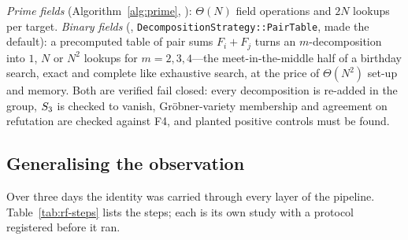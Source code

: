 \emph{Prime fields} (Algorithm~\ref{alg:prime},
): $\Theta(N)$ field operations and
$2N$ lookups per target. \emph{Binary fields}
(,
\texttt{DecompositionStrategy::PairTable}, made the default): a precomputed
table of pair sums $F_i+F_j$ turns an $m$-decomposition into $1$, $N$ or
$N^2$ lookups for $m=2,3,4$---the meet-in-the-middle half of a birthday
search, exact and complete like exhaustive search, at the price of
$\Theta(N^2)$ set-up and memory. Both are verified fail closed: every
decomposition is re-added in the group, $S_{3}$ is checked to vanish,
Gr\"obner-variety membership and agreement on refutation are checked
against F4, and planted positive controls must be found.

\subsection{Generalising the observation}

Over three days the identity was carried through every layer of the
pipeline. Table~\ref{tab:rf-steps} lists the steps; each is its own study
with a protocol registered before it ran.

